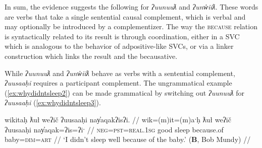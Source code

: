 In sum, the evidence suggests the following for \textit{ʔuunuuƛ} and \textit{ʔunw̓iiƛ}. These words are verbs that take a single sentential causal complement, which is verbal and may optionally be introduced by a complementizer. The way the \textsc{because} relation is syntactically related to its result is through coordination, either in a SVC which is analogous to the behavior of adpositive-like SVCs, or via a linker construction which links the result and the becausative.


While \textit{ʔuunuuƛ} and \textit{ʔunw̓iiƛ} behave as verbs with a sentential complement, \textit{ʔuusaaḥi} requires a participant complement. The ungrammatical example (\ref{ex:whydidntsleep2}) can be made grammatical by switching out \textit{ʔuunuuƛ} for \textit{ʔuusaaḥi} (\ref{ex:whydidntsleep3}).

\ex \label{ex:whydidntsleep3}
\begingl
\glpreamble wikitaḥ ƛuł weʔič ʔuusaaḥi nay̓aqakʔisʔi. //
\gla wik=(m)it=(m)aˑḥ ƛuł weʔič ʔuusaaḥi nay̓aqak=ʔis=ʔiˑ //
\glb \textsc{neg}=\textsc{pst}=\textsc{real.1sg} good sleep because.of baby=\textsc{dim}=\textsc{art} //
\glft `I didn't sleep well because of the baby.' (\textbf{B}, Bob Mundy) //
\endgl
\xe

\begin{comment}
\ex \label{ex:uusahi1}
\begingl
\glpreamble ʔuusaaḥimta nay̓aqakʔi. wikitaḥ ƛuł weʔič. //
\gla ʔuusaaḥi=imt=(m)aˑ nay̓aqak=ʔiˑ. wik=(m)it=(m)aˑḥ ƛuł weʔič //
\glb because.of=\textsc{pst}=\textsc{real.3} baby=\textsc{art} \textsc{neg}=\textsc{pst}=\textsc{real.1sg} good sleep //
\glft `It was because of the baby; I didn't sleep well.' (\textbf{B}, Bob Mundy) //
\endgl
\xe

\ex~ \label{ex:uusahi2}
\begingl
\glpreamble *ʔuusaaḥimta ʕiḥak nay̓aqakʔi. wikitaḥ ƛuł weʔič. //
\gla ʔuusaaḥi=imt=(m)aˑ ʕiḥak nay̓aqak=ʔiˑ. wik=(m)it=(m)aˑḥ ƛuł weʔič //
\glb because.of=\textsc{pst}=\textsc{real.3} cry.\textsc{dr} baby \textsc{neg}=\textsc{pst}=\textsc{real.1sg} good sleep //
\glft Intended: `It was because of the crying baby; I didn't sleep well.' (\textbf{B}, Bob Mundy) //
\endgl
\xe
\end{comment}

